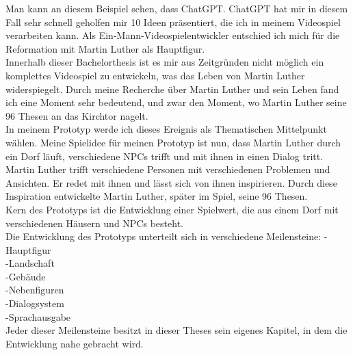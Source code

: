 \documentclass[12pt,a4paper,bibliography=totocnumbered,listof=totocnumbered]{scrartcl}
\begin{document}
Man kann an diesem Beispiel sehen, dass ChatGPT. ChatGPT hat mir in diesem Fall sehr schnell geholfen mir 10 Ideen präsentiert, die ich in meinem Videospiel verarbeiten kann.
Als Ein-Mann-Videospielentwickler entschied ich mich für die Reformation mit Martin Luther als Hauptfigur.
\\
Innerhalb dieser Bachelorthesis ist es mir aus Zeitgründen nicht möglich ein komplettes Videospiel zu entwickeln, was das Leben von Martin Luther widerspiegelt. Durch meine Recherche über Martin Luther und sein Leben fand ich eine Moment sehr bedeutend, und zwar den Moment, wo Martin Luther seine 96 Thesen an das Kirchtor nagelt.
\\
In meinem Prototyp werde ich dieses Ereignis als Thematischen Mittelpunkt wählen.
Meine Spielidee für meinen Prototyp ist nun, dass Martin Luther durch ein Dorf läuft, verschiedene NPCs trifft und mit ihnen in einen Dialog tritt. Martin Luther trifft verschiedene Personen mit verschiedenen Problemen und Ansichten. Er redet mit ihnen und lässt sich von ihnen inspirieren. Durch diese Inspiration entwickelte Martin Luther, später im Spiel, seine 96 Thesen.
\\
Kern des Prototyps ist die Entwicklung einer Spielwert, die aus einem Dorf mit verschiedenen Häusern und NPCs besteht.
\\
Die Entwicklung des Prototyps unterteilt sich in verschiedene Meilensteine:
-Hauptfigur
\\
-Landschaft
\\
-Gebäude
\\
-Nebenfiguren
\\
-Dialogsystem
\\
-Sprachausgabe
\\
Jeder dieser Meilensteine besitzt in dieser Theses sein eigenes Kapitel, in dem die Entwicklung nahe gebracht wird.
\end{document}
